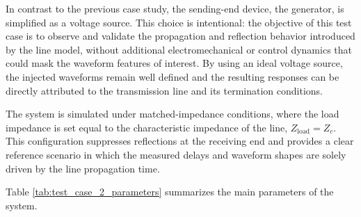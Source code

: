 In contrast to the previous case study, the sending-end device, the generator, is simplified as a voltage source.
This choice is intentional: the objective of this test case is to observe and validate the propagation and reflection behavior 
introduced by the line model, without additional electromechanical or control dynamics that could mask the waveform features of interest. 
By using an ideal voltage source, the injected waveforms remain well defined and the resulting responses can be directly attributed to the 
transmission line and its termination conditions.

The system is simulated under matched-impedance conditions, where the load impedance is set equal to the characteristic impedance of the line, 
$Z_{\text{load}} = Z_c$. This configuration suppresses reflections at the receiving end and provides a clear reference scenario in which the measured 
delays and waveform shapes are solely driven by the line propagation time.

Table \ref{tab:test_case_2_parameters} summarizes the main parameters of the system.

